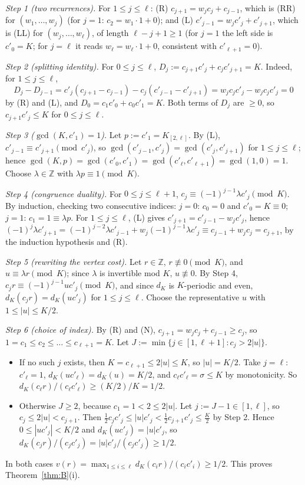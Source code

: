\documentclass[11pt]{amsart}
\theoremstyle{definition}
\theoremstyle{remark}
\newcommand{\Z}{\mathbb{Z}}
\begin{document}
\emph{Step 1 (two recurrences).} For $1\le j\le\ell$:
(R) $c_{j+1}=w_jc_j+c_{j-1}$, which is (RR) for $(w_1,\dots,w_j)$ (for $j=1$: $c_2=w_1\cdot1+0$); and
(L) $c'_{j-1}=w_jc'_j+c'_{j+1}$, which is (LL) for $(w_j,\dots,w_\ell)$, of length $\ell-j+1\ge1$ (for $j=1$ the left
side is $c'_0=K$; for $j=\ell$ it reads $w_\ell=w_\ell\cdot1+0$, consistent with $c'_{\ell+1}=0$).

\emph{Step 2 (splitting identity).} For $0\le j\le\ell$, $D_j:=c_{j+1}c'_j+c_jc'_{j+1}=K$. Indeed, for $1\le j\le\ell$,
\[
D_j-D_{j-1}=c'_j(c_{j+1}-c_{j-1})-c_j(c'_{j-1}-c'_{j+1})=w_jc_jc'_j-w_jc_jc'_j=0
\]
by (R) and (L), and $D_0=c_1c'_0+c_0c'_1=K$. Both terms of $D_j$ are $\ge0$, so $c_{j+1}c'_j\le K$ for $0\le j\le\ell$.

\emph{Step 3 ($\gcd(K,c'_1)=1$).} Let $p:=c'_1=K_{[2,\ell]}$. By (L), $c'_{j-1}\equiv c'_{j+1}\pmod{c'_j}$, so
$\gcd(c'_{j-1},c'_j)=\gcd(c'_j,c'_{j+1})$ for $1\le j\le\ell$; hence $\gcd(K,p)=\gcd(c'_0,c'_1)=\gcd(c'_\ell,c'_{\ell+1})
=\gcd(1,0)=1$. Choose $\lambda\in\Z$ with $\lambda p\equiv1\pmod K$.

\emph{Step 4 (congruence duality).} For $0\le j\le\ell+1$, $c_j\equiv(-1)^{j-1}\lambda c'_j\pmod K$. By induction,
checking two consecutive indices: $j=0$: $c_0=0$ and $c'_0=K\equiv0$; $j=1$: $c_1=1\equiv\lambda p$. For $1\le j\le\ell$,
(L) gives $c'_{j+1}=c'_{j-1}-w_jc'_j$, hence
$(-1)^j\lambda c'_{j+1}=(-1)^{j-2}\lambda c'_{j-1}+w_j(-1)^{j-1}\lambda c'_j\equiv c_{j-1}+w_jc_j=c_{j+1}$, by the induction
hypothesis and (R).

\emph{Step 5 (rewriting the vertex cost).} Let $r\in\Z$, $r\not\equiv0\pmod K$, and $u\equiv\lambda r\pmod K$; since
$\lambda$ is invertible mod $K$, $u\not\equiv0$. By Step 4, $c_jr\equiv(-1)^{j-1}uc'_j\pmod K$, and since $d_K$ is
$K$-periodic and even, $d_K(c_jr)=d_K(uc'_j)$ for $1\le j\le\ell$. Choose the representative $u$ with
$1\le|u|\le K/2$.

\emph{Step 6 (choice of index).} By (R) and (N), $c_{j+1}=w_jc_j+c_{j-1}\ge c_j$, so
$1=c_1\le c_2\le\dots\le c_{\ell+1}=K$. Let $J:=\min\{j\in[1,\ell+1]:c_j>2|u|\}$.
\begin{itemize}
\item If no such $j$ exists, then $K=c_{\ell+1}\le2|u|\le K$, so $|u|=K/2$. Take $j=\ell$: $c'_\ell=1$,
$d_K(uc'_\ell)=d_K(u)=K/2$, and $c_\ell c'_\ell=\sigma\le K$ by monotonicity. So
$d_K(c_\ell r)/(c_\ell c'_\ell)\ge(K/2)/K=1/2$.
\item Otherwise $J\ge2$, because $c_1=1<2\le2|u|$. Let $j:=J-1\in[1,\ell]$, so $c_j\le2|u|<c_{j+1}$. Then
$\frac12c_jc'_j\le|u|c'_j<\frac12c_{j+1}c'_j\le\frac K2$ by Step 2. Hence $0\le|uc'_j|<K/2$ and $d_K(uc'_j)=|u|c'_j$, so
$d_K(c_jr)/(c_jc'_j)=|u|c'_j/(c_jc'_j)\ge1/2$.
\end{itemize}
In both cases $v(r)=\max_{1\le i\le\ell}d_K(c_ir)/(c_ic'_i)\ge1/2$. This proves Theorem~\ref{thm:B}(i).
\end{document}
